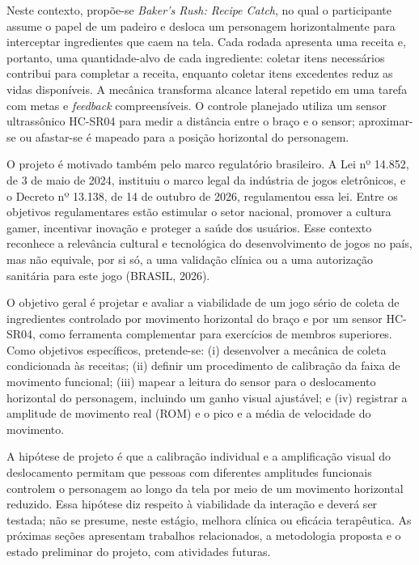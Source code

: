 \documentclass[12pt]{article}
\begin{document}
Neste contexto, propõe-se \textit{Baker's Rush: Recipe Catch}, no qual o participante assume o papel de um padeiro e desloca um personagem horizontalmente para interceptar ingredientes que caem na tela. Cada rodada apresenta uma receita e, portanto, uma quantidade-alvo de cada ingrediente: coletar itens necessários contribui para completar a receita, enquanto coletar itens excedentes reduz as vidas disponíveis. A mecânica transforma alcance lateral repetido em uma tarefa com metas e \textit{feedback} compreensíveis. O controle planejado utiliza um sensor ultrassônico HC-SR04 para medir a distância entre o braço e o sensor; aproximar-se ou afastar-se é mapeado para a posição horizontal do personagem.

O projeto é motivado também pelo marco regulatório brasileiro. A Lei nº 14.852, de 3 de maio de 2024, instituiu o marco legal da indústria de jogos eletrônicos, e o Decreto nº 13.138, de 14 de outubro de 2026, regulamentou essa lei. Entre os objetivos regulamentares estão estimular o setor nacional, promover a cultura gamer, incentivar inovação e proteger a saúde dos usuários. Esse contexto reconhece a relevância cultural e tecnológica do desenvolvimento de jogos no país, mas não equivale, por si só, a uma validação clínica ou a uma autorização sanitária para este jogo (BRASIL, 2026).

O objetivo geral é projetar e avaliar a viabilidade de um jogo sério de coleta de ingredientes controlado por movimento horizontal do braço e por um sensor HC-SR04, como ferramenta complementar para exercícios de membros superiores. Como objetivos específicos, pretende-se: (i) desenvolver a mecânica de coleta condicionada às receitas; (ii) definir um procedimento de calibração da faixa de movimento funcional; (iii) mapear a leitura do sensor para o deslocamento horizontal do personagem, incluindo um ganho visual ajustável; e (iv) registrar a amplitude de movimento real (ROM) e o pico e a média de velocidade do movimento.

A hipótese de projeto é que a calibração individual e a amplificação visual do deslocamento permitam que pessoas com diferentes amplitudes funcionais controlem o personagem ao longo da tela por meio de um movimento horizontal reduzido. Essa hipótese diz respeito à viabilidade da interação e deverá ser testada; não se presume, neste estágio, melhora clínica ou eficácia terapêutica. As próximas seções apresentam trabalhos relacionados, a metodologia proposta e o estado preliminar do projeto, com atividades futuras.
\end{document}
